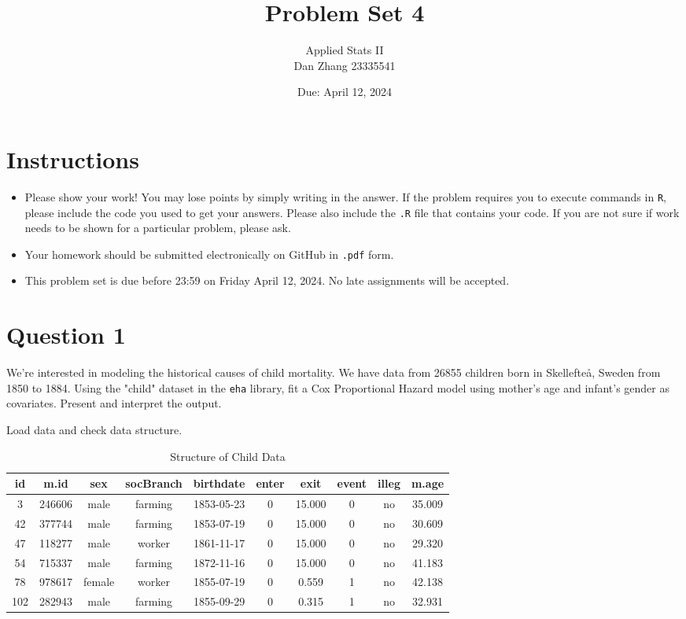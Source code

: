 \documentclass[12pt,letterpaper]{article}
\title{Problem Set 4}
\date{Due: April 12, 2024}
\author{Applied Stats II \\  Dan Zhang 23335541}
\begin{document}
	\maketitle
	\section*{Instructions}
	\begin{itemize}
	\item Please show your work! You may lose points by simply writing in the answer. If the problem requires you to execute commands in \texttt{R}, please include the code you used to get your answers. Please also include the \texttt{.R} file that contains your code. If you are not sure if work needs to be shown for a particular problem, please ask.
	\item Your homework should be submitted electronically on GitHub in \texttt{.pdf} form.
	\item This problem set is due before 23:59 on Friday April 12, 2024. No late assignments will be accepted.

	\end{itemize}

\newpage
\section*{Question 1}
\vspace{.25cm}
\noindent We're interested in modeling the historical causes of child mortality. We have data from 26855 children born in Skellefteå, Sweden from 1850 to 1884. Using the "child" dataset in the \texttt{eha} library, fit a Cox Proportional Hazard model using mother's age and infant's gender as covariates. Present and interpret the output.\vspace{.3cm}

\noindent Load data and check data structure.


\begin{table}[htbp]
	\centering
	\caption{Structure of Child Data}
	\label{tab:Structure of Child Data}
	\begin{tabular}{@{}cccccccccc@{}}
		\toprule
		id & m.id & sex & socBranch & birthdate & enter & exit & event & illeg & m.age \\
		\midrule
		3 & 246606 & male & farming & 1853-05-23 & 0 & 15.000 & 0 & no & 35.009 \\
		42 & 377744 & male & farming & 1853-07-19 & 0 & 15.000 & 0 & no & 30.609 \\
		47 & 118277 & male & worker & 1861-11-17 & 0 & 15.000 & 0 & no & 29.320 \\
		54 & 715337 & male & farming & 1872-11-16 & 0 & 15.000 & 0 & no & 41.183 \\
		78 & 978617 & female & worker & 1855-07-19 & 0 & 0.559 & 1 & no & 42.138 \\
		102 & 282943 & male & farming & 1855-09-29 & 0 & 0.315 & 1 & no & 32.931 \\
		\bottomrule
	\end{tabular}
\end{table}
\end{document}
